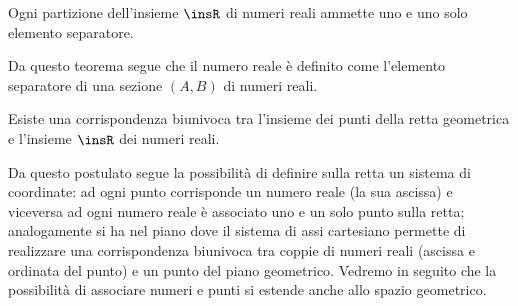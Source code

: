 \begin{teorema}[di Dedekind]
Ogni partizione dell'insieme \(\insR\) di numeri reali ammette uno e uno solo 
elemento separatore.
\end{teorema}

Da questo teorema segue che il numero reale è definito come l'elemento 
separatore di una sezione \((A,B)\) di numeri reali.

\begin{postulato}
Esiste una corrispondenza biunivoca tra l'insieme dei punti della retta 
geometrica e l'insieme \(\insR\) dei numeri reali.
\end{postulato}

Da questo postulato segue la possibilità di definire sulla retta un sistema di 
coordinate: ad ogni punto corrisponde un numero reale (la sua ascissa) e 
viceversa ad ogni numero reale è associato uno e un solo punto sulla retta; 
analogamente si ha nel piano dove il sistema di assi cartesiano permette di 
realizzare una corrispondenza biunivoca tra coppie di numeri reali (ascissa e 
ordinata del punto) e un punto del piano geometrico. Vedremo in seguito che la 
possibilità di associare numeri e punti si estende anche allo spazio geometrico.

% 

